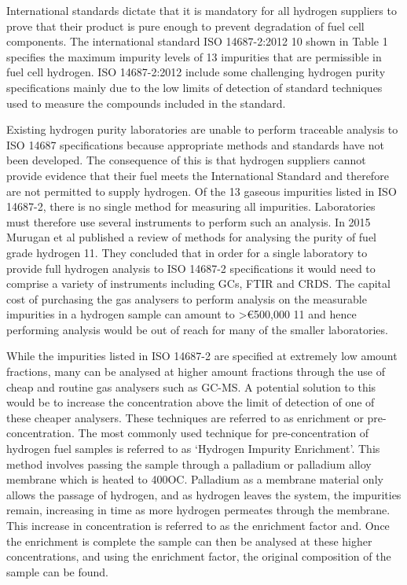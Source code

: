 International standards dictate that it is mandatory for all hydrogen suppliers to prove that their product is pure enough to prevent degradation of fuel cell components. The international standard ISO 14687-2:2012 10 shown in Table 1 specifies the maximum impurity levels of 13 impurities that are permissible in fuel cell hydrogen. ISO 14687-2:2012 include some challenging hydrogen purity specifications mainly due to the low limits of detection of standard techniques used to measure the compounds included in the standard. 

Existing hydrogen purity laboratories are unable to perform traceable analysis to ISO 14687 specifications because appropriate methods and standards have not been developed. The consequence of this is that hydrogen suppliers cannot provide evidence that their fuel meets the International Standard and therefore are not permitted to supply hydrogen. Of the 13 gaseous impurities listed in ISO 14687-2, there is no single method for measuring all impurities. Laboratories must therefore use several instruments to perform such an analysis.  In 2015 Murugan et al published a review of methods for analysing the purity of fuel grade hydrogen 11. They concluded that in order for a single laboratory to provide full hydrogen analysis to ISO 14687-2 specifications it would need to comprise a variety of instruments including GCs, FTIR and CRDS. The capital cost of purchasing the gas analysers to perform analysis on the measurable impurities in a hydrogen sample can amount to >€500,000 11 and hence performing analysis would be out of reach for many of the smaller laboratories. 

While the impurities listed in ISO 14687-2 are specified at extremely low amount fractions, many can be analysed at higher amount fractions through the use of cheap and routine gas analysers such as GC-MS. A potential solution to this would be to increase the concentration above the limit of detection of one of these cheaper analysers. These techniques are referred to as enrichment or pre-concentration. The most commonly used technique for pre-concentration of hydrogen fuel samples is referred to as ‘Hydrogen Impurity Enrichment’.  This method involves passing the sample through a palladium or palladium alloy membrane which is heated to 400OC. Palladium as a membrane material only allows the passage of hydrogen, and as hydrogen leaves the system, the impurities remain, increasing in time as more hydrogen permeates through the membrane.  This increase in concentration is referred to as the enrichment factor and. Once the enrichment is complete the sample can then be analysed at these higher concentrations, and using the enrichment factor, the original composition of the sample can be found. 

